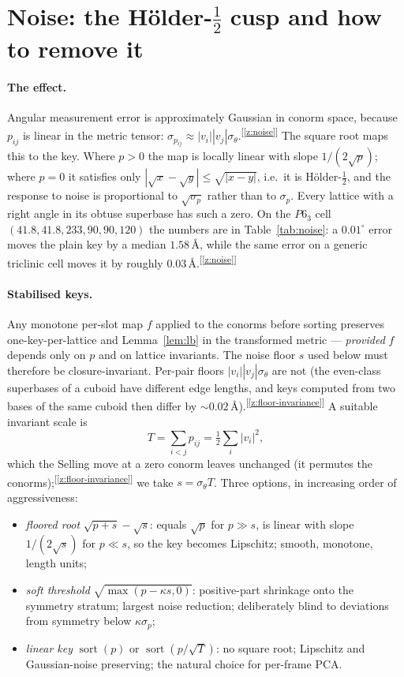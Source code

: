 \documentclass[11pt]{article}
\newcommand{\Ang}{\text{\AA}}
\newcommand{\chk}[1]{\textsuperscript{[\ref{#1}]}}
\begin{document}
\section{Noise: the H\"older-$\tfrac12$ cusp and how to remove it}
\label{app:noise}

\paragraph{The effect.}
Angular measurement error is approximately Gaussian in conorm space, because $p_{ij}$ is linear in the metric tensor: $\sigma_{p_{ij}}\approx|v_i||v_j|\sigma_\theta$.\chk{z:noise} The square root maps this to the key. Where $p>0$ the map is locally linear with slope $1/(2\sqrt p)$; where $p=0$ it satisfies only $|\sqrt x-\sqrt y|\le\sqrt{|x-y|}$, i.e.\ it is H\"older-$\tfrac12$, and the response to noise is proportional to $\sqrt{\sigma_p}$ rather than to $\sigma_p$. Every lattice with a right angle in its obtuse superbase has such a zero. On the $P6_3$ cell $(41.8,41.8,233,90,90,120)$ the numbers are in Table~\ref{tab:noise}: a $0.01^\circ$ error moves the plain key by a median $1.58\,\Ang$, while the same error on a generic triclinic cell moves it by roughly $0.03\,\Ang$.\chk{z:noise}

\paragraph{Stabilised keys.}
Any monotone per-slot map $f$ applied to the conorms before sorting preserves one-key-per-lattice and Lemma~\ref{lem:lb} in the transformed metric --- \emph{provided} $f$ depends only on $p$ and on lattice invariants. The noise floor $s$ used below must therefore be closure-invariant. Per-pair floors $|v_i||v_j|\sigma_\theta$ are not (the even-class superbases of a cuboid have different edge lengths, and keys computed from two bases of the same cuboid then differ by $\sim0.02\,\Ang$).\chk{z:floor-invariance} A suitable invariant scale is
\[
T=\sum_{i<j}p_{ij}=\tfrac12\sum_i|v_i|^2 ,
\]
which the Selling move at a zero conorm leaves unchanged (it permutes the conorms);\chk{z:floor-invariance} we take $s=\sigma_\theta T$. Three options, in increasing order of aggressiveness:
\begin{itemize}
\item \emph{floored root} $\sqrt{p+s}-\sqrt s$: equals $\sqrt p$ for $p\gg s$, is linear with slope $1/(2\sqrt s)$ for $p\ll s$, so the key becomes Lipschitz; smooth, monotone, length units;
\item \emph{soft threshold} $\sqrt{\max(p-\kappa s,0)}$: positive-part shrinkage onto the symmetry stratum; largest noise reduction; deliberately blind to deviations from symmetry below $\kappa\sigma_p$;
\item \emph{linear key} $\operatorname{sort}(p)$ or $\operatorname{sort}(p/\sqrt T)$: no square root; Lipschitz and Gaussian-noise preserving; the natural choice for per-frame PCA.
\end{itemize}
\end{document}
